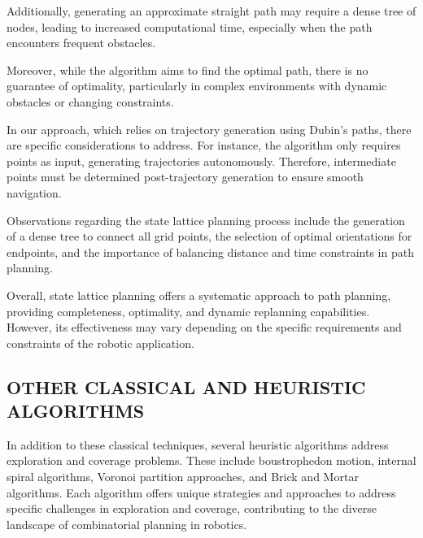 \vspace*{6mm}

Additionally, generating an approximate straight path may require a dense tree of nodes, leading to increased computational time, especially when the path encounters frequent obstacles.

\vspace*{6mm}

Moreover, while the algorithm aims to find the optimal path, there is no guarantee of optimality, particularly in complex environments with dynamic obstacles or changing constraints.

\vspace*{6mm}

In our approach, which relies on trajectory generation using Dubin's paths, there are specific considerations to address. For instance, the algorithm only requires points as input, generating trajectories autonomously. Therefore, intermediate points must be determined post-trajectory generation to ensure smooth navigation.

\vspace*{6mm}

Observations regarding the state lattice planning process include the generation of a dense tree to connect all grid points, the selection of optimal orientations for endpoints, and the importance of balancing distance and time constraints in path planning.

\vspace*{6mm}

Overall, state lattice planning offers a systematic approach to path planning, providing completeness, optimality, and dynamic replanning capabilities. However, its effectiveness may vary depending on the specific requirements and constraints of the robotic application.


\subsection{OTHER CLASSICAL AND HEURISTIC ALGORITHMS}

In addition to these classical techniques, several heuristic algorithms address exploration and coverage problems. These include boustrophedon motion, internal spiral algorithms, Voronoi partition approaches, and Brick and Mortar algorithms. Each algorithm offers unique strategies and approaches to address specific challenges in exploration and coverage, contributing to the diverse landscape of combinatorial planning in robotics.





















